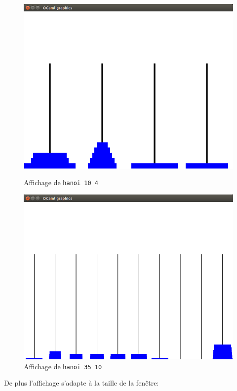 \documentclass[a4paper, 11pt]{article}%
\begin{document}
		\begin{figure}[!h]
			  \includegraphics[width=\linewidth]{hanoi_10_4.png}
			  \caption{Affichage de \texttt{hanoi 10 4}}
			\endminipage\hfill
			  \includegraphics[width=\linewidth]{hanoi_35_10.png}
			  \caption{Affichage de \texttt{hanoi 35 10}}
			\endminipage\hfill
		\end{figure}
		
		De plus l'affichage s'adapte à la taille de la fenêtre:
		
\end{document}
